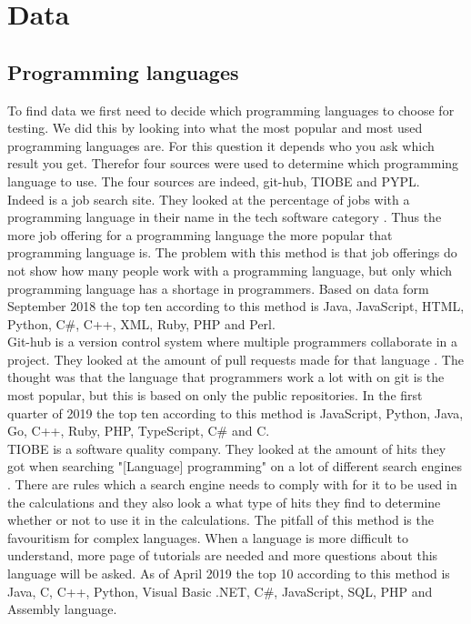 \chapter{Data}
\label{ch:data}

\section{Programming languages}
To find data we first need to decide which programming languages to choose for testing. We did this by looking into what the most popular and most used programming languages are. For this question it depends who you ask which result you get. Therefor four sources were used to determine which programming language to use. The four sources are indeed, git-hub, TIOBE and PYPL.\\

Indeed is a job search site. They looked at the percentage of jobs with a programming language in their name in the tech software category \cite{ray:2018}. Thus the more job offering for a programming language the more popular that programming language is. The problem with this method is that job offerings do not show how many people work with a programming language, but only which programming language has a shortage in programmers. Based on data form September 2018 the top ten according to this method is Java, JavaScript, HTML, Python, C\#, C++, XML, Ruby, PHP and Perl.\\

Git-hub is a version control system where multiple programmers collaborate in a project. They looked at the amount of pull requests made for that language \cite{zap:2019}. The thought was that the language that programmers work a lot with on git is the most popular, but this is based on only the public repositories. In the first quarter of 2019 the top ten according to this method is JavaScript, Python, Java, Go, C++, Ruby, PHP, TypeScript, C\# and C. \\

TIOBE is a software quality company. They looked at the amount of hits they got when searching "[Language] programming" on a lot of different search engines \cite{tio:2019}. There are rules which a search engine needs to comply with for it to be used in the calculations and they also look a what type of hits they find to determine whether or not to use it in the calculations. The pitfall of this method is the favouritism for complex languages. When a language is more difficult to understand, more page of tutorials are needed and more questions about this language will be asked. As of April 2019 the top 10 according to this method is Java, C, C++, Python, Visual Basic .NET, C\#, JavaScript, SQL, PHP and Assembly language.\\

